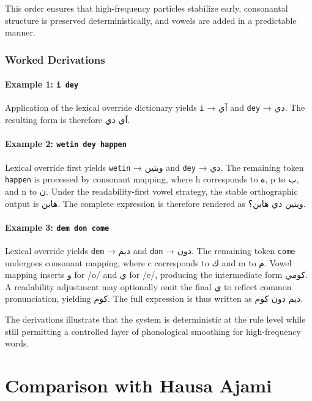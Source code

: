 \documentclass[12pt]{article}
\newcommand{\AR}[1]{\foreignlanguage{arabic}{#1}}
\begin{document}
This order ensures that high-frequency particles stabilize early, consonantal structure is preserved deterministically, and vowels are added in a predictable manner.

\subsubsection{Worked Derivations}

\paragraph{Example 1: \texttt{i dey}}

Application of the lexical override dictionary yields \texttt{i} → \AR{آي} and \texttt{dey} → \AR{دي}. The resulting form is therefore \AR{آي دي}.

\paragraph{Example 2: \texttt{wetin dey happen}}

Lexical override first yields \texttt{wetin} → \AR{ويتين} and \texttt{dey} → \AR{دي}. The remaining token \texttt{happen} is processed by consonant mapping, where h corresponds to \AR{ه}, p to \AR{ب}, and n to \AR{ن}. Under the readability-first vowel strategy, the stable orthographic output is \AR{هابن}. The complete expression is therefore rendered as \AR{ويتين دي هابن؟}.

\paragraph{Example 3: \texttt{dem don come}}

Lexical override yields \texttt{dem} → \AR{ديم} and \texttt{don} → \AR{دون}. The remaining token \texttt{come} undergoes consonant mapping, where c corresponds to \AR{ك} and m to \AR{م}. Vowel mapping inserts \AR{و} for /o/ and \AR{ي} for /e/, producing the intermediate form \AR{كومي}. A readability adjustment may optionally omit the final \AR{ي} to reflect common pronunciation, yielding \AR{كوم}. The full expression is thus written as \AR{ديم دون كوم}.

The derivations illustrate that the system is deterministic at the rule level while still permitting a controlled layer of phonological smoothing for high-frequency words.

\section{Comparison with Hausa Ajami}
\end{document}
